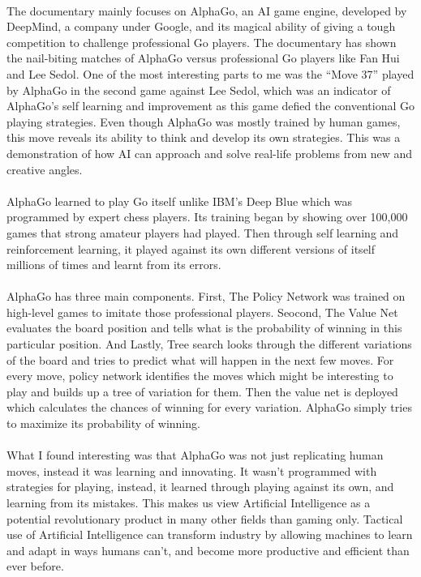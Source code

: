 \documentclass[44pt]{article}
\begin{document}
\paragraph{}
	The documentary mainly focuses on AlphaGo, an AI game engine, developed by DeepMind, a company under Google, and its magical ability of giving a tough competition to challenge professional Go players.
	The documentary has shown the nail-biting matches of AlphaGo versus professional Go players like Fan Hui and Lee Sedol.
	One of the most interesting parts to me was the “Move 37” played by AlphaGo in the second game against Lee Sedol, which was an indicator of AlphaGo’s self learning and improvement as this game defied the conventional Go playing strategies. 
	Even though AlphaGo was mostly trained by human games, this move reveals its ability to think and develop its own strategies.
	This was a demonstration of how AI can approach and solve real-life problems from new and creative angles.


\paragraph{}
	AlphaGo learned to play Go itself unlike IBM’s Deep Blue which was programmed by expert chess players.
	Its training began by showing over 100,000 games that strong amateur players had played.
	Then through self learning and reinforcement learning, it played against its own different versions of itself millions of times and learnt from its errors.


\paragraph{}
	AlphaGo has three main components. 	
	First, The Policy Network was trained on high-level games to imitate those professional players. 
	Seocond, The Value Net evaluates the board position and tells what is the probability of winning in this particular position. 
	And Lastly, Tree search looks through the different variations of the board and tries to predict what will happen in the next few moves. 
	For every move, policy network identifies the moves which might be interesting to play and builds up a tree of variation for them. 
	Then the value net is deployed which calculates the chances of winning for every variation. 
	AlphaGo simply tries to maximize its probability of winning.




\paragraph{}
	What I found interesting was that AlphaGo was not just replicating human moves, instead it was learning and innovating. 
	It wasn’t programmed with strategies for playing, instead, it learned through playing against its own, and learning from its mistakes. 
	This makes us view Artificial Intelligence as a potential revolutionary product in many other fields than gaming only.
	Tactical use of Artificial Intelligence can transform industry by allowing machines to learn and adapt in ways humans can’t, and become more productive and efficient than ever before.
\end{document}

